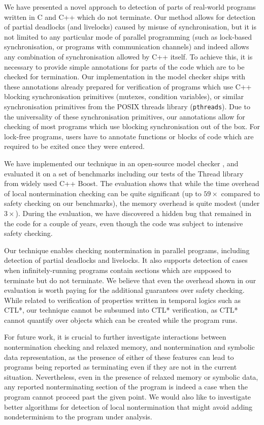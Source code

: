 We have presented a novel approach to detection of parts of real-world programs written in C and C++ which do not terminate.
Our method allows for detection of partial deadlocks (and livelocks) caused by misuse of synchronisation, but it is not limited to any particular mode of parallel programming (such as lock-based synchronisation, or programs with communication channels) and indeed allows any combination of synchronisation allowed by C++ itself.
To achieve this, it is necessary to provide simple annotations for parts of the code which are to be checked for termination.
Our implementation in the \divine model checker ships with these annotations already prepared for verification of programs which use C++ blocking synchronisation primitives (mutexes, condition variables), or similar synchronisation primitives from the POSIX threads library (\texttt{pthreads}).
Due to the universality of these synchronisation primitives, our annotations allow for checking of most programs which use blocking synchronisation out of the box.
For lock-free programs, users have to annotate functions or blocks of code which are required to be exited once they were entered.

We have implemented our technique in an open-source model checker \divine, and evaluated it on a set of benchmarks including our tests of the Thread library from widely used C++ Boost.
The evaluation shows that while the time overhead of local nontermination checking can be quite significant (up to $59\times$ compared to safety checking on our benchmarks), the memory overhead is quite modest (under $3\times$).
During the evaluation, we have discovered a hidden bug that remained in the code for a couple of years, even though the code was subject to intensive safety checking.

Our technique enables checking nontermination in parallel programs, including
detection of partial deadlocks and livelocks.
It also supports detection of cases when infinitely-running programs contain
sections which are supposed to terminate but do not terminate.
We believe that even the overhead shown in our evaluation is worth paying for the
additional guarantees over safety checking.
While related to verification of properties written in temporal logics such as CTL*, our technique cannot be subsumed into CTL* verification, as CTL* cannot quantify over objects which can be created while the program runs.

For future work, it is crucial to further investigate interactions between nontermination checking and relaxed memory, and nontermination and symbolic data representation, as the presence of either of these features can lead to programs being reported as terminating even if they are not in the current situation.
Nevertheless, even in the presence of relaxed memory or symbolic data, any reported nonterminating section of the program is indeed a case when the program cannot proceed past the given point.
We would also like to investigate better algorithms for detection of local nontermination that might avoid adding nondeterminism to the program under analysis.
